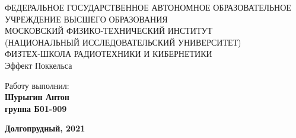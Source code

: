 \begin{center}
    {\small ФЕДЕРАЛЬНОЕ ГОСУДАРСТВЕННОЕ АВТОНОМНОЕ ОБРАЗОВАТЕЛЬНОЕ\\ УЧРЕЖДЕНИЕ ВЫСШЕГО ОБРАЗОВАНИЯ\\ МОСКОВСКИЙ ФИЗИКО-ТЕХНИЧЕСКИЙ ИНСТИТУТ\\ (НАЦИОНАЛЬНЫЙ ИССЛЕДОВАТЕЛЬСКИЙ УНИВЕРСИТЕТ)\\ ФИЗТЕХ-ШКОЛА РАДИОТЕХНИКИ И КИБЕРНЕТИКИ}\\
    \hfill \break
    \hfill \break
    \hfill \break
    \Huge{Эффект Поккельса}\\
\end{center}
  
  \hfill \break
  \hfill \break
  \hfill \break
  \hfill \break
  \hfill \break
  \hfill \break
  
  \begin{flushright}
    \normalsize{Работу выполнил:}\\
    \normalsize{\textbf{Шурыгин Антон \\группа Б01-909}} \\
  \end{flushright}
  
  \begin{center}
    \normalsize{\textbf{Долгопрудный, 2021}}
  \end{center}
  
  
  \thispagestyle{empty} %
  
  
  \newpage
  \thispagestyle{plain}
  \tableofcontents
  \thispagestyle{plain}
  \newpage